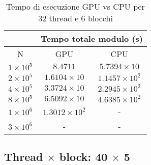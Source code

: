 \begin{table}[ht!]
    \begin{center}
        \renewcommand{\arraystretch}{1.5}
        \begin{adjustbox}{width=.45\textwidth}
            \begin{tabular}{ |c|c|c| }
                \hline
                \multicolumn{1}{|c}{} & \multicolumn{2}{|c|}{Tempo totale modulo (s)} \\
                \hline
                 N & GPU & CPU \\
                 \hline 
                 $1 \times 10^5$ & $8.4711$ & $5.7394 \times 10$ \\
                 \hline 
                 $2 \times 10^5$ & $1.6104 \times 10$ & $1.1457 \times 10^{2}$ \\
                 \hline 
                 $4 \times 10^5$ & $3.3724 \times 10$ & $2.2945 \times 10^{2}$ \\
                 \hline 
                 $8 \times 10^5$ & $6.5092 \times 10$ & $4.6385 \times 10^{2}$ \\
                 \hline 
                 $1 \times 10^6$ & $1.3012 \times 10^{2}$ & - \\
                 \hline 
                 $3 \times 10^6$ & - & - \\
                 \hline 
            \end{tabular}
        \end{adjustbox}
    \end{center}
    \caption{Tempo di esecuzione GPU vs CPU per 32 thread e 6 blocchi}
    \label{tab:time_table_32x6}
\end{table}


\newpage
\subsection{Thread $\times$ block: 40 $\times$ 5}


